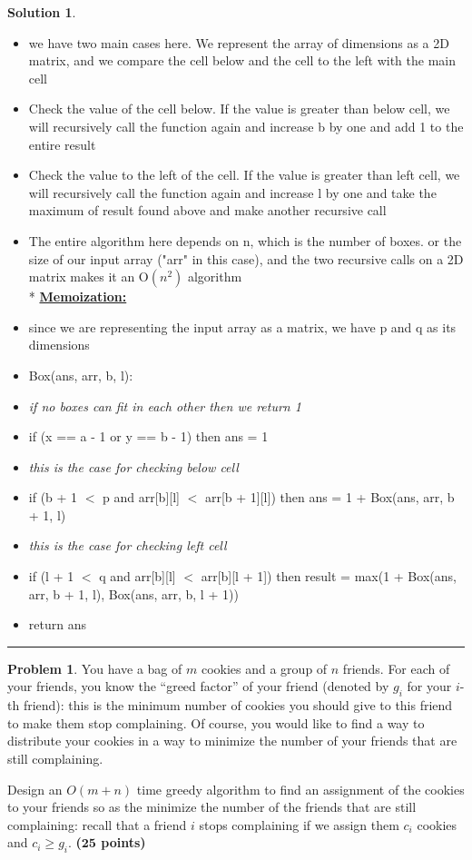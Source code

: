 \documentclass{article}
\theoremstyle{definition}
\newtheorem{problem}{Problem}
\def\fline{\rule{0.75\linewidth}{0.5pt}}
\newcommand{\finishline}{\vspace{-15pt}\begin{center}\fline\end{center}}
\newtheorem*{solution*}{Solution}
\newenvironment{solution}{\begin{solution*}}{{\finishline} \end{solution*}}
\newcommand{\grade}[1]{\hfill{\textbf{($\mathbf{#1}$ points)}}}
\begin{document}
\begin{solution}
\begin{itemize}
		\item we have two main cases here. We represent the array of dimensions as a 2D matrix, and we compare the cell below and the cell to the left with the main cell
		\item[1. ] Check the value of the cell below. If the value is greater than below cell, we will recursively call the function again and increase b by one and add 1 to the entire result
		\item[2. ] Check the value to the left of the cell. If the value is greater than left cell, we will recursively call the function again and increase l by one and take the maximum of result found above and make another recursive call
		\item The entire algorithm here depends on n, which is the number of boxes. or the size of our input array ("arr" in this case), and the two recursive calls on a 2D matrix makes it an O$(n^{2})$ algorithm \bigskip\\*
	\textbf{\underline{Memoization:}} 
		\item since we are representing the input array as a matrix, we have p and q as its dimensions
		\item Box(ans, arr, b, l):
		\item[]\textit{ if no boxes can fit in each other then we return 1}
		\item[1. ] if (x == a - 1 or y == b - 1) then ans = 1
		\item[] \textit{this is the case for checking below cell}
		\item[2. ] if (b + 1 $<$ p and arr[b][l] $<$ arr[b + 1][l]) then ans = 1 + Box(ans, arr, b + 1, l) 
		\item[] \textit{this is the case for checking left cell}
		\item[3. ]if (l + 1 $<$ q and arr[b][l] $<$ arr[b][l + 1]) then  result = max(1 + Box(ans, arr, b + 1, l), Box(ans, arr, b, l + 1))  
		\item[4. ] return ans
	\end{itemize}
\end{solution}

\smallskip

\begin{problem}
	You have a bag of $m$ cookies and a group of $n$ friends. For each of your friends, you know the ``greed factor'' of your friend (denoted by $g_i$ for your $i$-th friend): 
	this is the minimum number of cookies you should give to this friend to make them stop complaining. Of course, you would like to find a way to distribute your cookies in a way to minimize the number of your friends that are still complaining. 
	
	Design an $O(m+n)$ time greedy algorithm to find an assignment of the cookies to your friends so as the minimize the number of the friends that are still complaining: 
	recall that a friend $i$ stops complaining if we assign them $c_i$ cookies and $c_i \geq g_i$. \grade{25}
	
\end{problem}
\end{document}
